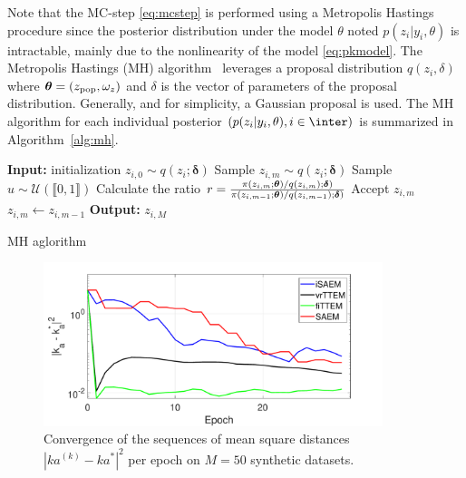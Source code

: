 \documentclass[journal, 11pt]{IEEEtran}
\begin{document}
Note that the {\sf MC-step} \eqref{eq:mcstep} is performed using a Metropolis Hastings procedure since the posterior distribution under the model $\theta$ noted $p(z_i | y_i, \theta)$ is intractable, mainly due to the nonlinearity of the model \eqref{eq:pkmodel}.
The Metropolis Hastings (MH) algorithm~\cite{meyn2012markov} leverages a proposal distribution $q(z_{i}, \delta)$ where ${\bm{\theta}} = (z_{\rm pop}, \omega_{z})$ and $ \delta$ is the vector of parameters of the proposal distribution. Generally, and for simplicity, a Gaussian proposal is used. 
The MH algorithm for each individual posterior $\left(p(z_i | y_i, \theta), i\in \inter \right)$ is summarized in Algorithm~\ref{alg:mh}.

\begin{minipage}{0.45\linewidth}
\begin{algorithm}[H]
\begin{algorithmic}[1]
\STATE \textbf{Input:} initialization $z_{i,0} \sim q(z_{i}; {\bm \delta})$
\STATE Sample $z_{i,m} \sim q(z_{i}; {\bm \delta})$
\STATE Sample $u \sim \mathcal{U}(\llbracket 0, 1 \rrbracket)$
\STATE Calculate the ratio $r = \frac{\pi(z_{i,m}; {\bm{\theta}})/q(z_{i,m}); {\bm \delta})}{\pi(z_{i,m-1}; {\bm{\theta}})/q(z_{i,m-1}); {\bm \delta})}$
\STATE Accept $z_{i,m}$
\ELSE
\STATE $z_{i,m} \leftarrow z_{i,m-1}$
\ENDIF
\ENDFOR
\STATE \textbf{Output:} $z_{i,M}$
\end{algorithmic}
\caption{MH aglorithm}
\label{alg:mh}
        \end{algorithm}
\end{minipage}
\hspace{0.1in}
\begin{minipage}{0.55\linewidth}
\begin{figure}[H]
\centering
\includegraphics[width=3.9in]{fig/figpk-eps-converted-to.pdf}
\caption{Convergence of the sequences of mean square distances $|ka^{(k)} - ka^*|^2$ per epoch on $M=50$ synthetic datasets.}
\label{fig:pk_tts}
\end{figure}
\end{minipage}\vspace{0.5in}
\end{document}
